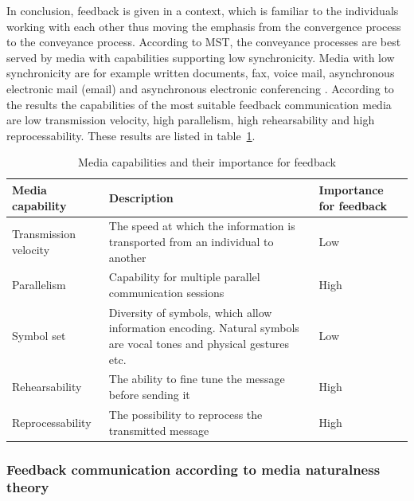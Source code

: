 \documentclass[english,12pt,a4paper,pdftex]{article}
\begin{document}
In conclusion, feedback is given in a context, which is familiar to the individuals working with each other thus moving the emphasis from the convergence process to the conveyance process. According to \ac{MST}, the conveyance processes are best served by media with capabilities supporting low synchronicity. Media with low synchronicity are for example written documents, fax, voice mail, asynchronous electronic mail (email) and asynchronous electronic conferencing \citep{dennis1999}. According to the results the capabilities of the most suitable feedback communication media are low transmission velocity, high parallelism, high rehearsability and high reprocessability. These results are listed in table~\ref{table:mst_feedback}.

\begin{table}[!h]
\renewcommand{\arraystretch}{1.3}
\caption{Media capabilities and their importance for feedback}
\label{table:mst_feedback}
\centering
\begin{tabular}{|p{4cm}|p{7cm}|p{3cm}|}
\hline
\textbf{Media capability} & \textbf{Description} & \textbf{Importance for feedback}\\
\hline
Transmission velocity & The speed at which the information is transported from an individual to another & Low \\
\hline
Parallelism & Capability for multiple parallel communication sessions & High \\
\hline
Symbol set & Diversity of symbols, which allow information encoding. Natural symbols are vocal tones and physical gestures etc. & Low \\
\hline
Rehearsability & The ability to fine tune the message before sending it & High \\
\hline
Reprocessability & The possibility to reprocess the transmitted message & High \\
\hline
\end{tabular}
\end{table}

\subsubsection{Feedback communication according to media naturalness theory}
\end{document}
